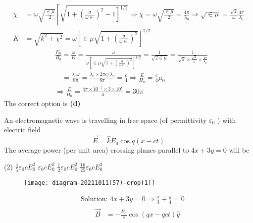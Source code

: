 \begin{enumerate}
\begin{answer}
$$\begin{aligned}
	\chi &=\omega \sqrt{\frac{\in \mu}{2}}\left[\sqrt{\left.1+\left(\frac{\sigma}{\omega \in}\right)^{2}-1\right]^{1 / 2}} \Rightarrow \chi=\omega \sqrt{\frac{\in \mu}{2}}=\frac{4 \pi}{\lambda_{0}} \Rightarrow \sqrt{\in \mu}=\frac{\sqrt{2}}{\omega} \frac{4 \pi}{\lambda_{0}}\right.\\
	K &=\sqrt{k^{2}+\chi^{2}}=\omega\left[\in \mu \sqrt{1+\left(\frac{\sigma}{\omega \in}\right)^{2}}\right]^{1 / 2}
	\end{aligned}
	$$
	$$
	\begin{aligned}
	&\frac{E_{0}}{B_{0}}=\frac{\omega}{K}=\frac{\omega}{\omega\left[\in \mu \sqrt{1+\left(\frac{\sigma}{\omega \in}\right)^{2}}\right]^{1 / 2}}=\frac{1}{\sqrt{2 \in \mu}}=\frac{1}{\sqrt{2} \times \frac{\sqrt{2}}{\omega} \times \frac{4 \pi}{\lambda_{0}}} \\
	&\quad=\frac{\lambda_{0} \omega}{8 \pi}=\frac{\lambda_{0} \times 2 \pi c / \lambda_{0}}{8 \pi}=\frac{c}{4} \Rightarrow \frac{E}{H_{0}}=\frac{c}{4} \mu_{0} \\
	&\Rightarrow \frac{E}{H_{0}}=\frac{4 \pi \times 10^{-7} \times 3 \times 10^{8}}{4}=30 \pi
	\end{aligned}
	$$
	The correct option is \textbf{(d)}	
\end{answer}
\begin{minipage}{\textwidth}
	\item An electromagnetic wave is travelling in free space (of permittivity $\varepsilon_{0}$ ) with electric field
	$$
	\vec{E}=\hat{k} E_{0} \cos q(x-c t)
	$$
	The average power (per unit area) crossing planes parallel to $4 x+3 y=0$ will be
\end{minipage}
\begin{tasks}(2)
	\task[\textbf{A.}] $\frac{4}{5} \varepsilon_{0} c E_{0}^{2}$
	\task[\textbf{B.}]$\varepsilon_{0} c E_{0}^{2}$
	\task[\textbf{C.}]$\frac{1}{2} \varepsilon_{0} c E_{0}^{2}$
	\task[\textbf{D.}] $\frac{16}{25} \varepsilon_{0} c E_{0}^{2}$
\end{tasks}
\begin{answer}
	\begin{figure}[H]
		\centering
		\texttt{[image: diagram-20211011(57)-crop(1)]}
	\end{figure}
	$$\begin{aligned}
	&\text { Solution: } 4 x+3 y=0 \Rightarrow \frac{x}{3}+\frac{y}{4}=0 \\
	&\qquad \begin{aligned}
	\vec{B} &=-\frac{E_{0}}{c} \cos (q x-q c t) \hat{y} \\

\end{aligned}
\end{aligned}$$
\end{answer}
\end{enumerate}
